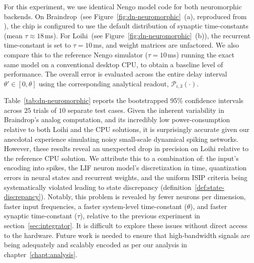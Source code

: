 For this experiment, we use identical Nengo model code for both neuromorphic backends.
On Braindrop~(see Figure~\ref{fig:dn-neuromorphic}~(a), reproduced from \citet[][Figure~16]{braindrop2019}),
the chip is configured to use the default distribution of synaptic time-constants (mean $\tau \approx 18$\,ms).
For Loihi~(see Figure~\ref{fig:dn-neuromorphic}~(b)), the recurrent time-constant is set to $\tau=10$\,ms, and weight matrices are unfactored.
We also compare this to the reference Nengo simulator ($\tau=10$\,ms) running the exact same model on a conventional desktop CPU, to obtain a baseline level of performance.
The overall error is evaluated across the entire delay interval $\theta' \in [0, \theta]$ using the corresponding analytical readout, $\mathcal{P}_{i, 3}(\cdot)$.

Table~\ref{tab:dn-neuromorphic} reports the bootstrapped 95\% confidence intervals across $25$ trials of $10$ separate test cases.
Given the inherent variability in Braindrop's analog computation, and its incredibly low power-consumption relative to both Loihi and the CPU solutions, it is surprisingly accurate given our anecdotal experience simulating noisy small-scale dynamical spiking networks.
However, these results reveal an unexpected drop in precision on Loihi relative to the reference CPU solution.
We attribute this to a combination of: the input's encoding into spikes, the LIF neuron model's discretization in time, quantization errors in neural states and recurrent weights, and the uniform ISIP criteria being systematically violated leading to state discrepancy (definition~\ref{def:state-discrepancy}).
Notably, this problem is revealed by fewer neurons per dimension, faster input frequencies, a faster system-level time-constant ($\theta$), and faster synaptic time-constant ($\tau$), relative to the previous experiment in section~\ref{sec:integrator}.
It is difficult to explore these issues without direct access to the hardware.
Future work is needed to ensure that high-bandwidth signals are being adequately and scalably encoded as per our analysis in chapter~\ref{chapt:analysis}.

